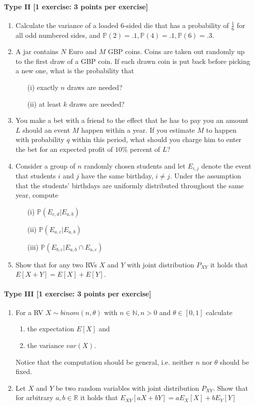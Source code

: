 \documentclass{article}
\begin{document}
\paragraph{Type II [1 exercise: 3 points per exercise]}
\begin{enumerate}
\item Calculate the variance of a loaded 6-sided die that has a probability of $\frac{1}{6}$ for all odd numbered sides, and $\mathbb{P}(2) = .1,  \mathbb{P}(4) = .1, \mathbb{P}(6) = .3$.
	\item A jar contains $N$ Euro and $M$ GBP coins. Coins are taken out randomly up to the first draw of a GBP coin. If each drawn coin is put back before picking a new one, what is the probability that
		\begin{itemize}
			\item[(i)] exactly $n$ draws are needed?
			\item[(ii)] at least $k$ draws are needed?
		\end{itemize}
	\item You make a bet with a friend to the effect that he has to pay you an amount $L$ should an event $M$ happen within a year. If you estimate $M$ to happen with probability $q$ within this period, what should you charge him to enter the bet for an expected profit of $10\%$ percent of $L$?
	\item Consider a group of $n$ randomly chosen students and let $E_{i,j}$ denote the event that students $i$ and $j$ have the same birthday, $i \neq j$. Under the assumption that the students' birthdays are uniformly distributed throughout the same year, compute
		\begin{itemize}
			\item[(i)] $\mathbb{P}(E_{c,d}|E_{a,b})$
			\item[(ii)] $\mathbb{P}(E_{a,c}|E_{a,b})$
			\item[(iii)] $\mathbb{P}(E_{b,c}|E_{a,b} \cap E_{a,c})$
		\end{itemize}
	\item Show that for any two RVs $ X $ and $ Y $ with joint distribution $ P_{XY} $ it holds that $ E[X+Y] = E[X] + E[Y] $.
	\end{enumerate}

	\paragraph{Type III [1 exercise: 3 points per exercise]}
\begin{enumerate}
\item For a RV $ X \sim binom(n,\theta) $ with $ n \in \mathbb{N}, n > 0 $ and $ \theta \in [0,1] $ calculate
	\begin{enumerate}
		\item the expectation $ E[X] $ and
		\item the variance $ var(X) $.
	\end{enumerate}
	Notice that the computation should be general, i.e. neither $ n $ nor $ \theta $ should be fixed.
\item Let $X$ and $Y$ be two random variables with joint distribution $P_{XY}$. Show that for arbitrary $a,b \in \mathbb{R}$ it holds that $E_{XY}[aX + bY] = a E_X[X] + b E_Y[Y]$
\end{enumerate}
\end{document}
